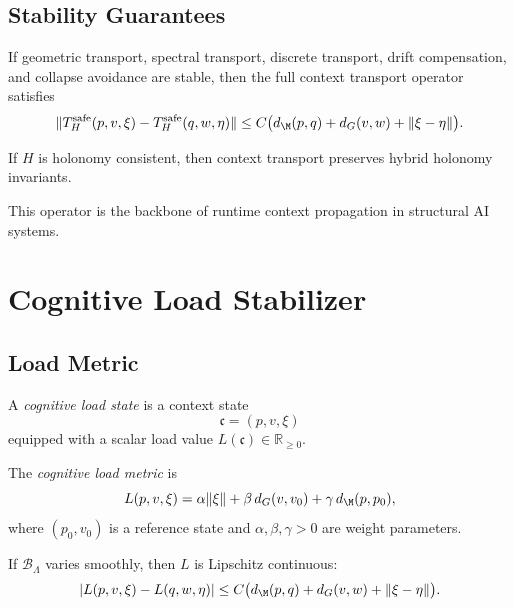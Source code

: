 \subsection{Stability Guarantees}

\begin{theorem}
If geometric transport, spectral transport, discrete transport, drift
compensation, and collapse avoidance are stable, then the full context
transport operator satisfies
\[
\| T_H^\mathrm{safe}(p,v,\xi) - T_H^\mathrm{safe}(q,w,\eta) \|
\le C \big( d_\M(p,q) + d_G(v,w) + \|\xi - \eta\| \big).
\]
\end{theorem}

\begin{lemma}
If $H$ is holonomy consistent, then context transport preserves
hybrid holonomy invariants.
\end{lemma}

\begin{remark}
This operator is the backbone of runtime context propagation in
structural AI systems.
\end{remark} 


\section{Cognitive Load Stabilizer}

\subsection{Load Metric}

\begin{definition}
A \emph{cognitive load state} is a context state
\[
\mathfrak{c} = (p, v, \xi)
\]
equipped with a scalar load value $L(\mathfrak{c}) \in \mathbb{R}_{\ge 0}$.
\end{definition}

\begin{definition}
The \emph{cognitive load metric} is
\[
L(p,v,\xi)
= \alpha \|\xi\|
+ \beta\, d_G(v, v_0)
+ \gamma\, d_\M(p, p_0),
\]
where $(p_0,v_0)$ is a reference state and $\alpha,\beta,\gamma > 0$ are
weight parameters.
\end{definition}

\begin{lemma}
If $\mathcal{B}_\Lambda$ varies smoothly, then $L$ is Lipschitz continuous:
\[
|L(p,v,\xi) - L(q,w,\eta)|
\le C \big( d_\M(p,q) + d_G(v,w) + \|\xi - \eta\| \big).
\]
\end{lemma}

